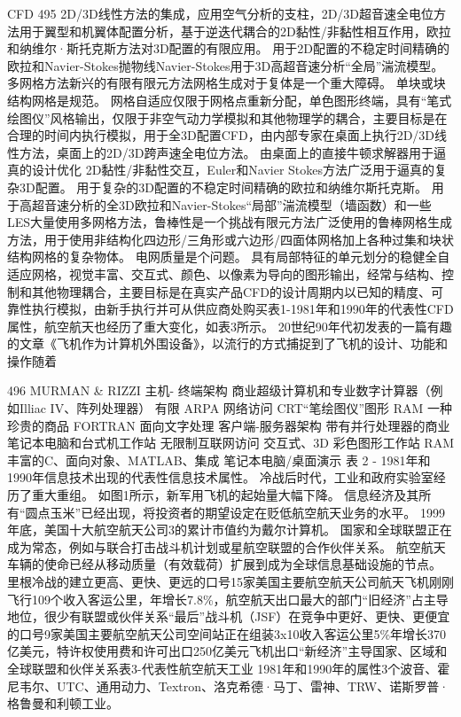 \documentclass[UTF8,11pt,a4paper,openany,fontset=fandol]{ctexbook}
\begin{document}
CFD 495 2D/3D线性方法的集成，应用空气分析的支柱，2D/3D超音速全电位方法用于翼型和机翼体配置分析，基于逆迭代耦合的2D黏性/非黏性相互作用，欧拉和纳维尔·斯托克斯方法对3D配置的有限应用。 用于2D配置的不稳定时间精确的欧拉和Navier-Stokes抛物线Navier-Stokes用于3D高超音速分析“全局”湍流模型。 多网格方法新兴的有限有限元方法网格生成对于复体是一个重大障碍。 单块或块结构网格是规范。 网格自适应仅限于网格点重新分配，单色图形终端，具有“笔式绘图仪”风格输出，仅限于非空气动力学模拟和其他物理学的耦合，主要目标是在合理的时间内执行模拟，用于全3D配置CFD，由内部专家在桌面上执行2D/3D线性方法，桌面上的2D/3D跨声速全电位方法。 由桌面上的直接牛顿求解器用于逼真的设计优化 2D黏性/非黏性交互，Euler和Navier Stokes方法广泛用于逼真的复杂3D配置。 用于复杂的3D配置的不稳定时间精确的欧拉和纳维尔斯托克斯。 用于高超音速分析的全3D欧拉和Navier-Stokes“局部”湍流模型（墙函数）和一些LES大量使用多网格方法，鲁棒性是一个挑战有限元方法广泛使用的鲁棒网格生成方法，用于使用非结构化四边形/三角形或六边形/四面体网格加上各种过集和块状结构网格的复杂物体。 电网质量是个问题。 具有局部特征的单元划分的稳健全自适应网格，视觉丰富、交互式、颜色、以像素为导向的图形输出，经常与结构、控制和其他物理耦合，主要目标是在真实产品CFD的设计周期内以已知的精度、可靠性执行模拟，由新手执行并可从供应商处购买表1-1981年和1990年的代表性CFD属性，航空航天也经历了重大变化，如表3所示。 20世纪90年代初发表的一篇有趣的文章《飞机作为计算机外围设备》，以流行的方式捕捉到了飞机的设计、功能和操作随着

496 MURMAN \& RIZZI 主机- 终端架构 商业超级计算机和专业数字计算器（例如Illiac IV、阵列处理器） 有限 ARPA 网络访问 CRT“笔绘图仪”图形 RAM 一种珍贵的商品 FORTRAN 面向文字处理 客户端-服务器架构 带有并行处理器的商业笔记本电脑和台式机工作站 无限制互联网访问 交互式、3D 彩色图形工作站 RAM 丰富的C、面向对象、MATLAB、集成 笔记本电脑/桌面演示 表 2 - 1981年和1990年信息技术出现的代表性信息技术属性。 冷战后时代，工业和政府实验室经历了重大重组。 如图1所示，新军用飞机的起始量大幅下降。 信息经济及其所有“圆点玉米”已经出现，将投资者的期望设定在贬低航空航天业务的水平。 1999年底，美国十大航空航天公司3的累计市值约为戴尔计算机。 国家和全球联盟正在成为常态，例如与联合打击战斗机计划或星航空联盟的合作伙伴关系。 航空航天车辆的使命已经从移动质量（有效载荷）扩展到成为全球信息基础设施的节点。 里根冷战的建立更高、更快、更远的口号15家美国主要航空航天公司航天飞机刚刚飞行109个收入客运公里，年增长7.8\%，航空航天出口最大的部门“旧经济”占主导地位，很少有联盟或伙伴关系“最后”战斗机（JSF）在竞争中更好、更快、更便宜的口号9家美国主要航空航天公司空间站正在组装3x10收入客运公里5\%年增长370亿美元，特许权使用费和许可出口250亿美元飞机出口“新经济”主导国家、区域和全球联盟和伙伴关系表3-代表性航空航天工业 1981年和1990年的属性3个波音、霍尼韦尔、UTC、通用动力、Textron、洛克希德·马丁、雷神、TRW、诺斯罗普·格鲁曼和利顿工业。
\end{document}
